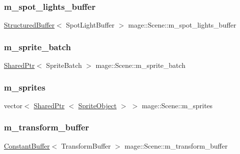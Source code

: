 \subsubsection{\texorpdfstring{m\+\_\+spot\+\_\+lights\+\_\+buffer}{m\_spot\_lights\_buffer}}
{\footnotesize\ttfamily \hyperlink{structmage_1_1_structured_buffer}{Structured\+Buffer}$<$ Spot\+Light\+Buffer $>$ mage\+::\+Scene\+::m\+\_\+spot\+\_\+lights\+\_\+buffer\hspace{0.3cm}{\ttfamily [private]}}

\hypertarget{classmage_1_1_scene_a7a334e1b7764532817f10efbc0b91a82}{}\label{classmage_1_1_scene_a7a334e1b7764532817f10efbc0b91a82} 
\subsubsection{\texorpdfstring{m\+\_\+sprite\+\_\+batch}{m\_sprite\_batch}}
{\footnotesize\ttfamily \hyperlink{namespacemage_a1e01ae66713838a7a67d30e44c67703e}{Shared\+Ptr}$<$ Sprite\+Batch $>$ mage\+::\+Scene\+::m\+\_\+sprite\+\_\+batch\hspace{0.3cm}{\ttfamily [private]}}

\hypertarget{classmage_1_1_scene_a7379b399f02999f89f6ccda5bfa01b02}{}\label{classmage_1_1_scene_a7379b399f02999f89f6ccda5bfa01b02} 
\subsubsection{\texorpdfstring{m\+\_\+sprites}{m\_sprites}}
{\footnotesize\ttfamily vector$<$ \hyperlink{namespacemage_a1e01ae66713838a7a67d30e44c67703e}{Shared\+Ptr} $<$ \hyperlink{classmage_1_1_sprite_object}{Sprite\+Object} $>$ $>$ mage\+::\+Scene\+::m\+\_\+sprites\hspace{0.3cm}{\ttfamily [private]}}

\hypertarget{classmage_1_1_scene_a2e57c981725d0a64bfc8f82381ac3d6a}{}\label{classmage_1_1_scene_a2e57c981725d0a64bfc8f82381ac3d6a} 
\subsubsection{\texorpdfstring{m\+\_\+transform\+\_\+buffer}{m\_transform\_buffer}}
{\footnotesize\ttfamily \hyperlink{structmage_1_1_constant_buffer}{Constant\+Buffer}$<$ Transform\+Buffer $>$ mage\+::\+Scene\+::m\+\_\+transform\+\_\+buffer\hspace{0.3cm}{\ttfamily [private]}}

